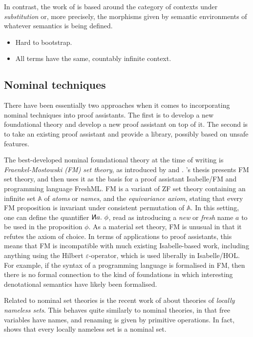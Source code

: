 In contrast, the work of \citet{HHLM22} is based around the category of contexts
under \emph{substitution} or, more precisely, the morphisms given by semantic
environments of whatever semantics is being defined.

\begin{itemize}
  \item Hard to bootstrap.
  \item All terms have the same, countably infinite context.
\end{itemize}

\subsection{Nominal techniques}

There have been essentially two approaches when it comes to incorporating
nominal techniques into proof assistants.
The first is to develop a new foundational theory and develop a new proof
assistant on top of it.
The second is to take an existing proof assistant and provide a library,
possibly based on unsafe features.

The best-developed nominal foundational theory at the time of writing is
\emph{Fraenkel-Mostowski (FM) set theory}, as introduced by
\citet{Gabbay-thesis} and \citet{GP02}.
\citeauthor{Gabbay-thesis}'s thesis presents FM set theory, and then uses it as
the basis for a proof assistant Isabelle/FM and programming language FreshML\@.
FM is a variant of ZF set theory containing an infinite set $\mathbb A$ of
\emph{atoms} or \emph{names}, and the \emph{equivariance axiom}, stating that
every FM proposition is invariant under consistent permutation of $\mathbb A$.
In this setting, one can define the quantifier
$\reflectbox{$\mathsf N$}a.~\phi$,
read as introducing a \emph{new} or \emph{fresh} name $a$ to be used in the
proposition $\phi$.
As a material set theory, FM is unusual in that it refutes the axiom of choice.
In terms of applications to proof assistants, this means that FM is incompatible
with much existing Isabelle-based work, including anything using the Hilbert
$\varepsilon$-operator, which is used liberally in Isabelle/HOL\@.
For example, if the syntax of a programming language is formalised in FM, then
there is no formal connection to the kind of foundations in which interesting
denotational semantics have likely been formalised.

Related to nominal set theories is the recent work of \citet{Pitts23} about
theories of \emph{locally nameless sets}.
This behaves quite similarly to nominal theories, in that free variables have
names, and renaming is given by primitive operations.
In fact, \citet{Pitts23} shows that every locally nameless set is a nominal set.

